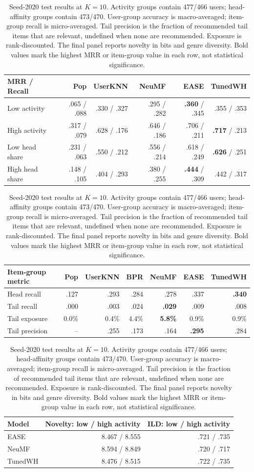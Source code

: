 \documentclass[12pt,a4paper]{article}   %
\begin{document}
\begin{table}[H]
\centering
\begingroup
\setlength{\tabcolsep}{3pt}

\begin{tabular}{lrrrrr}
\toprule
MRR / Recall & Pop & UserKNN & NeuMF & EASE & TunedWH \\
\midrule
Low activity
& .065 / .088
& .330 / .327
& .295 / .282
& \textbf{.360} / .345
& .355 / .353 \\

High activity
& .317 / .079
& .628 / .176
& .646 / .186
& .706 / .211
& \textbf{.717} / .213 \\

Low head share
& .231 / .063
& .550 / .212
& .556 / .214
& .618 / .249
& \textbf{.626} / .251 \\

High head share
& .148 / .105
& .404 / .293
& .380 / .255
& \textbf{.444} / .309
& .442 / .317 \\
\bottomrule
\end{tabular}

\vspace{6pt}

\begin{tabular}{lrrrrrr}
\toprule
Item-group metric & Pop & UserKNN & BPR & NeuMF & EASE & TunedWH \\
\midrule
Head recall
& .127 & .293 & .284 & .278 & .337 & \textbf{.340} \\

Tail recall
& .000 & .003 & .024 & \textbf{.029} & .009 & .008 \\

Tail exposure
& 0.0\% & 0.4\% & 4.4\% & \textbf{5.8\%} & 0.9\% & 0.9\% \\

Tail precision
& -- & .255 & .173 & .164 & \textbf{.295} & .284 \\
\bottomrule
\end{tabular}

\vspace{6pt}

\begin{tabular}{lrr}
\toprule
Model & Novelty: low / high activity & ILD: low / high activity \\
\midrule
EASE & 8.467 / 8.555 & .721 / .735 \\
NeuMF & 8.594 / 8.849 & .720 / .717 \\
TunedWH & 8.476 / 8.515 & .722 / .735 \\
\bottomrule
\end{tabular}

\endgroup
\caption{Seed-2020 test results at $K=10$.
Activity groups contain 477/466 users; head-affinity
groups contain 473/470. User-group accuracy is macro-averaged;
item-group recall is micro-averaged. Tail precision is the
fraction of recommended tail items that are relevant,
undefined when none are recommended. Exposure is
rank-discounted. The final panel reports novelty in bits
and genre diversity. Bold values mark the highest MRR
or item-group value in each row, not statistical significance.}
\label{tab:groups}
\end{table}
\end{document}
